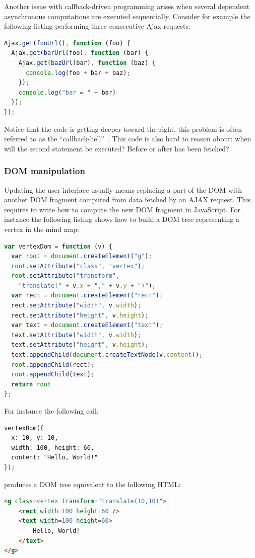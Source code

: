 \documentclass[american,english,runningheads]{llncs}
\begin{document}
Another issue with callback-driven programming arises when several dependent asynchronous computations are executed sequentially. Consider for example the following listing performing three consecutive Ajax requests:

\begin{lstlisting}[language=JavaScript,label=async-callback-hell,caption=Sequential asynchronous calls]
Ajax.get(fooUrl(), function (foo) {
  Ajax.get(barUrl(foo), function (bar) {
    Ajax.get(bazUrl(bar), function (baz) {
      console.log(foo + bar + baz);
    });
    console.log("bar = " + bar)
  });
});
\end{lstlisting}

Notice that the code is getting deeper toward the right, this problem is often referred to as the “callback-hell”~\cite{McKenna_Roy}. This code is also hard to reason about: when will the second  statement be executed? Before or after  has been fetched?

\subsubsection{DOM manipulation}
\label{forest}

Updating the user interface usually means replacing a part of the DOM with another DOM fragment computed from data fetched by an AJAX request. This requires to write how to compute the new DOM fragment in JavaScript. For instance the following listing shows how to build a DOM tree representing a vertex in the mind map:

\begin{lstlisting}[language=JavaScript,label=dom-api,caption=DOM fragment creation using the native API]
var vertexDom = function (v) {
  var root = document.createElement("g");
  root.setAttribute("class", "vertex");
  root.setAttribute("transform",
    "translate(" + v.x + "," + v.y + ")");
  var rect = document.createElement("rect");
  rect.setAttribute("width", v.width);
  rect.setAttribute("height", v.height);
  var text = document.createElement("text");
  text.setAttribute("width", v.width);
  text.setAttribute("height", v.height);
  text.appendChild(document.createTextNode(v.content));
  root.appendChild(rect);
  root.appendChild(text);
  return root
};
\end{lstlisting}

For instance the following call:
\begin{lstlisting}
vertexDom({
  x: 10, y: 10,
  width: 100, height: 60,
  content: "Hello, World!"
});
\end{lstlisting}
produces a DOM tree equivalent to the following HTML:
\begin{lstlisting}[language=HTML]
<g class=vertex transform="translate(10,10)">
    <rect width=100 height=60 />
    <text width=100 height=60>
        Hello, World!
    </text>
</g>
\end{lstlisting}
\end{document}
